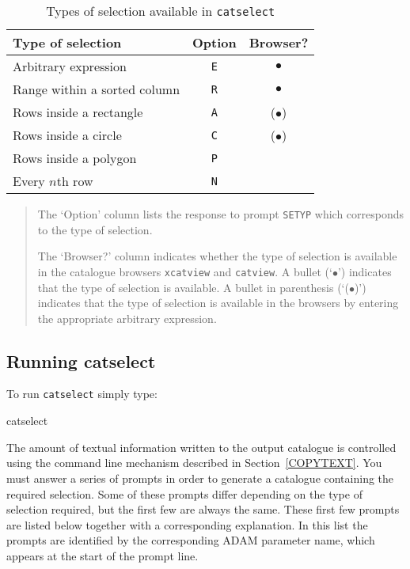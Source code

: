 \documentclass[twoside,11pt]{starlink}
\begin{document}
\begin{table}[htbp]

\begin{center}
\begin{tabular}{lcc}
Type of selection            & Option   & Browser?    \\ \hline
Arbitrary expression         & \texttt{E}  & $\bullet$   \\
Range within a sorted column & \texttt{R}  & $\bullet$   \\
Rows inside a rectangle      & \texttt{A}  & ($\bullet$) \\
Rows inside a circle         & \texttt{C}  & ($\bullet$) \\
Rows inside a polygon        & \texttt{P}  & \\
Every $n$th row              & \texttt{N}  & \\
\end{tabular}
\end{center}

\begin{quote}
The `Option' column lists the response to prompt \texttt{SETYP} which
corresponds to the type of selection.

The `Browser?' column indicates whether the type of selection is
available in the catalogue browsers \texttt{xcatview} and \texttt{catview}.
A bullet (`$\bullet$') indicates that the type of selection is
available.  A bullet in parenthesis (`($\bullet$)') indicates that the
type of selection is available in the browsers by entering the
appropriate arbitrary expression.
\end{quote}

\caption{Types of selection available in \texttt{catselect}
\label{SELTYPT} }

\end{table}

\subsection{Running catselect}

To run \texttt{catselect} simply type:

\begin{terminalv}
catselect
\end{terminalv}

The amount of textual information written to the output catalogue is
controlled using the command line mechanism described in
Section~\ref{COPYTEXT}.
You must answer a series of prompts in order to generate a catalogue
containing the required selection.  Some of these prompts differ
depending on the type of selection required, but the first few are
always the same.  These first few prompts are listed below together
with a corresponding explanation.  In this list the prompts are
identified by the corresponding ADAM parameter name, which appears at
the start of the prompt line.
\end{document}

